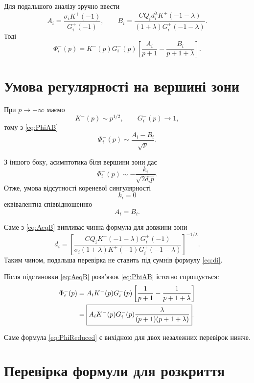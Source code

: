 \documentclass[12pt,a4paper]{article}
\begin{document}
Для подальшого аналізу зручно ввести
\begin{equation}
\label{eq:AB}
  A_i=
  \frac{\sigma_iK^+(-1)}{G_i^+(-1)},
  \qquad
  B_i=
  \frac{C Q_i d_i^\lambda K^+(-1-\lambda)}
       {(1+\lambda)G_i^+(-1-\lambda)}.
\end{equation}
Тоді
\begin{equation}
\label{eq:PhiAB}
  \Phi_i^-(p)=
  K^-(p)G_i^-(p)
  \left[
    \frac{A_i}{p+1}
    -\frac{B_i}{p+1+\lambda}
  \right].
\end{equation}

\section{Умова регулярності на вершині зони}

При $p\to+\infty$ маємо
\[
  K^-(p)\sim p^{1/2},
  \qquad
  G_i^-(p)\to1,
\]
тому з \eqref{eq:PhiAB}
\[
  \Phi_i^-(p)
  \sim
  \frac{A_i-B_i}{\sqrt{p}}.
\]

З іншого боку, асимптотика біля вершини зони дає
\[
  \Phi_i^-(p)
  \sim
  -\frac{k_i}{\sqrt{2d_i p}}.
\]
Отже, умова відсутності кореневої сингулярності
\[
  k_i=0
\]
еквівалентна співвідношенню
\begin{equation}
\label{eq:AeqB}
  \boxed{A_i=B_i}.
\end{equation}

Саме з \eqref{eq:AeqB} випливає чинна формула для довжини зони
\begin{equation}
\label{eq:di}
  d_i=
  \left[
    \frac{C Q_iK^+(-1-\lambda)G_i^+(-1)}
         {\sigma_i(1+\lambda)K^+(-1)G_i^+(-1-\lambda)}
  \right]^{-1/\lambda}.
\end{equation}
Таким чином, подальша перевірка не ставить під сумнів
формулу \eqref{eq:di}.

Після підстановки \eqref{eq:AeqB} розв'язок
\eqref{eq:PhiAB} істотно спрощується:
\begin{align}
  \Phi_i^-(p)
  &=
  A_iK^-(p)G_i^-(p)
  \left[
    \frac{1}{p+1}
    -\frac{1}{p+1+\lambda}
  \right]
  \notag\\
  &=
  \boxed{
  A_iK^-(p)G_i^-(p)
  \frac{\lambda}
       {(p+1)(p+1+\lambda)}
  }.
\label{eq:PhiReduced}
\end{align}

Саме формула \eqref{eq:PhiReduced} є вихідною для двох незалежних
перевірок нижче.

\section{Перевірка формули для розкриття}
\end{document}
